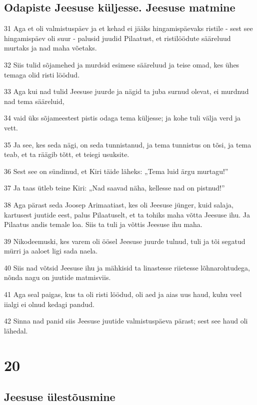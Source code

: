 \section*{Odapiste Jeesuse küljesse. Jeesuse matmine}

\par 31 Aga et oli valmistuspäev ja et kehad ei jääks hingamispäevaks ristile - sest see hingamispäev oli suur - palusid juudid Pilaatust, et ristilöödute sääreluud murtaks ja nad maha võetaks.
\par 32 Siis tulid sõjamehed ja murdsid esimese sääreluud ja teise omad, kes ühes temaga olid risti löödud.
\par 33 Aga kui nad tulid Jeesuse juurde ja nägid ta juba surnud olevat, ei murdnud nad tema sääreluid,
\par 34 vaid üks sõjameestest pistis odaga tema küljesse; ja kohe tuli välja verd ja vett.
\par 35 Ja see, kes seda nägi, on seda tunnistanud, ja tema tunnistus on tõsi, ja tema teab, et ta räägib tõtt, et teiegi usuksite.
\par 36 Sest see on sündinud, et Kiri täide läheks: „Tema luid ärgu murtagu!”
\par 37 Ja taas ütleb teine Kiri: „Nad saavad näha, kellesse nad on pistnud!”
\par 38 Aga pärast seda Joosep Arimaatiast, kes oli Jeesuse jünger, kuid salaja, kartusest juutide eest, palus Pilaatuselt, et ta tohiks maha võtta Jeesuse ihu. Ja Pilaatus andis temale loa. Siis ta tuli ja võttis Jeesuse ihu maha.
\par 39 Nikodeemuski, kes varem oli öösel Jeesuse juurde tulnud, tuli ja tõi segatud mürri ja aaloet ligi sada naela.
\par 40 Siis nad võtsid Jeesuse ihu ja mähkisid ta linastesse riietesse lõhnarohtudega, nõnda nagu on juutide matmisviis.
\par 41 Aga seal paigas, kus ta oli risti löödud, oli aed ja aias uus haud, kuhu veel iialgi ei olnud kedagi pandud.
\par 42 Sinna nad panid siis Jeesuse juutide valmistuspäeva pärast; sest see haud oli lähedal.


\chapter{20}

\section*{Jeesuse ülestõusmine}

